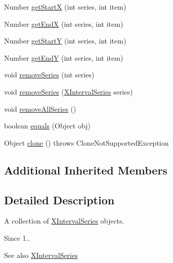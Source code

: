 \begin{DoxyCompactItemize}
\item 
Number \mbox{\hyperlink{classorg_1_1jfree_1_1data_1_1xy_1_1_x_interval_series_collection_a253894bbb8b5b711cb26a9a13f776bc7}{get\+StartX}} (int series, int item)
\item 
Number \mbox{\hyperlink{classorg_1_1jfree_1_1data_1_1xy_1_1_x_interval_series_collection_a1b58332e3a54baab086dd084a77a4c48}{get\+EndX}} (int series, int item)
\item 
Number \mbox{\hyperlink{classorg_1_1jfree_1_1data_1_1xy_1_1_x_interval_series_collection_a2856a59b5f688fcf7c824c1c0c1daa41}{get\+StartY}} (int series, int item)
\item 
Number \mbox{\hyperlink{classorg_1_1jfree_1_1data_1_1xy_1_1_x_interval_series_collection_aea748f575e39ffb8faf923a15d7f3792}{get\+EndY}} (int series, int item)
\item 
void \mbox{\hyperlink{classorg_1_1jfree_1_1data_1_1xy_1_1_x_interval_series_collection_aff7ecd1e435dcb31e24b01905984e407}{remove\+Series}} (int series)
\item 
void \mbox{\hyperlink{classorg_1_1jfree_1_1data_1_1xy_1_1_x_interval_series_collection_a0fa876719b5f5ade9f8934817014d428}{remove\+Series}} (\mbox{\hyperlink{classorg_1_1jfree_1_1data_1_1xy_1_1_x_interval_series}{X\+Interval\+Series}} series)
\item 
void \mbox{\hyperlink{classorg_1_1jfree_1_1data_1_1xy_1_1_x_interval_series_collection_a7cd0071751dd1010ae0aefb2443b3f3a}{remove\+All\+Series}} ()
\item 
boolean \mbox{\hyperlink{classorg_1_1jfree_1_1data_1_1xy_1_1_x_interval_series_collection_acb4f857f493fb079dd9236863a1a1214}{equals}} (Object obj)
\item 
Object \mbox{\hyperlink{classorg_1_1jfree_1_1data_1_1xy_1_1_x_interval_series_collection_aeb5828647df709d6be050259d9dfde45}{clone}} ()  throws Clone\+Not\+Supported\+Exception 
\end{DoxyCompactItemize}
\subsection*{Additional Inherited Members}


\subsection{Detailed Description}
A collection of \mbox{\hyperlink{classorg_1_1jfree_1_1data_1_1xy_1_1_x_interval_series}{X\+Interval\+Series}} objects.

\begin{DoxySince}{Since}
1..
\end{DoxySince}
\begin{DoxySeeAlso}{See also}
\mbox{\hyperlink{classorg_1_1jfree_1_1data_1_1xy_1_1_x_interval_series}{X\+Interval\+Series}} 
\end{DoxySeeAlso}


